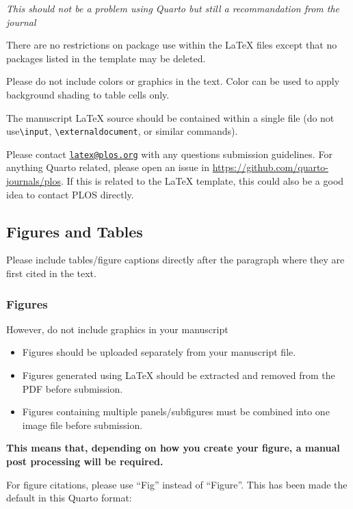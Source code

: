 \documentclass[
  10pt,
  letterpaper,
]{article}
\providecommand{\tightlist}{%
  \setlength{\itemsep}{0pt}\setlength{\parskip}{0pt}}\usepackage{longtable,booktabs,array}
\begin{document}
\emph{This should not be a problem using Quarto but still a
recommandation from the journal}

There are no restrictions on package use within the LaTeX files except
that no packages listed in the template may be deleted.

Please do not include colors or graphics in the text. Color can be used
to apply background shading to table cells only.

The manuscript LaTeX source should be contained within a single file (do
not use\texttt{\textbackslash{}input},
\texttt{\textbackslash{}externaldocument}, or similar commands).

Please contact \href{mailto:latex@plos.org}{\nolinkurl{latex@plos.org}}
with any questions submission guidelines. For anything Quarto related,
please open an issue in \url{https://github.com/quarto-journals/plos}.
If this is related to the LaTeX template, this could also be a good idea
to contact PLOS directly.

\hypertarget{figures-and-tables}{%
\subsection{Figures and Tables}\label{figures-and-tables}}

Please include tables/figure captions directly after the paragraph where
they are first cited in the text.

\hypertarget{figures}{%
\subsubsection{Figures}\label{figures}}

However, do not include graphics in your manuscript

\begin{itemize}
\tightlist
\item
  Figures should be uploaded separately from your manuscript file.
\item
  Figures generated using LaTeX should be extracted and removed from the
  PDF before submission.
\item
  Figures containing multiple panels/subfigures must be combined into
  one image file before submission.
\end{itemize}

\textbf{This means that, depending on how you create your figure, a
manual post processing will be required.}

For figure citations, please use ``Fig'' instead of ``Figure''. This has
been made the default in this Quarto format:
\end{document}
